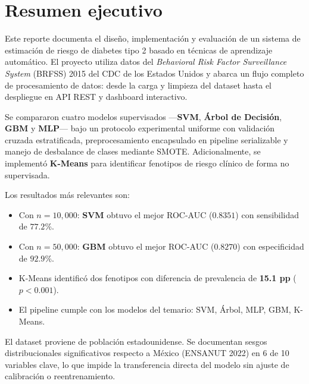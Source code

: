 \documentclass[12pt,a4paper]{article}
\begin{document}
\tableofcontents
\newpage

\section{Resumen ejecutivo}

Este reporte documenta el diseño, implementación y evaluación de un sistema de estimación de riesgo de diabetes tipo 2 basado en técnicas de aprendizaje automático. El proyecto utiliza datos del \textit{Behavioral Risk Factor Surveillance System} (BRFSS) 2015 del CDC de los Estados Unidos y abarca un flujo completo de procesamiento de datos: desde la carga y limpieza del dataset hasta el despliegue en API REST y dashboard interactivo.

Se compararon cuatro modelos supervisados —\textbf{SVM}, \textbf{Árbol de Decisión}, \textbf{GBM} y \textbf{MLP}— bajo un protocolo experimental uniforme con validación cruzada estratificada, preprocesamiento encapsulado en pipeline serializable y manejo de desbalance de clases mediante SMOTE. Adicionalmente, se implementó \textbf{K-Means} para identificar fenotipos de riesgo clínico de forma no supervisada.

Los resultados más relevantes son:

\begin{itemize}[noitemsep]
  \item Con $n=10{,}000$: \textbf{SVM} obtuvo el mejor ROC-AUC ($0.8351$) con sensibilidad de $77.2\%$.
  \item Con $n=50{,}000$: \textbf{GBM} obtuvo el mejor ROC-AUC ($0.8270$) con especificidad de $92.9\%$.
  \item K-Means identificó dos fenotipos con diferencia de prevalencia de \textbf{15.1 pp} ($p{<}0.001$).
  \item El pipeline cumple con los modelos del temario: SVM, Árbol, MLP, GBM, K-Means.
\end{itemize}

\begin{alertbox}
  El dataset proviene de población estadounidense. Se documentan sesgos distribucionales significativos respecto a México (ENSANUT 2022) en 6 de 10 variables clave, lo que impide la transferencia directa del modelo sin ajuste de calibración o reentrenamiento.
\end{alertbox}
\end{document}
